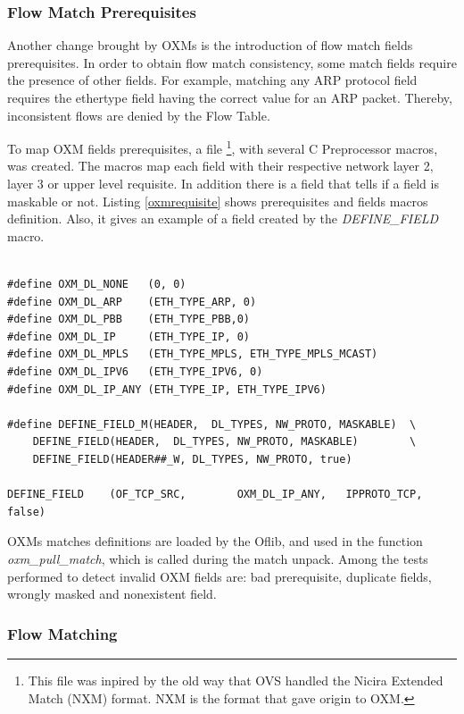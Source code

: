     \subsubsection{Flow Match Prerequisites}
    
    Another change brought by OXMs is the introduction of flow match fields prerequisites. In order to obtain flow match consistency, some match fields require the presence of other fields. For example, matching any ARP protocol field requires the ethertype field having the correct value for an ARP packet. Thereby, inconsistent flows are denied by the Flow Table.  
      
    To map OXM fields prerequisites, a file \footnote{This file was inpired by the old way that OVS handled the Nicira Extended Match (NXM) format. NXM is the format that gave origin to OXM.}, with several C Preprocessor macros, was created. The macros map each field with their respective network layer 2, layer 3 or upper level requisite. In addition there is a field that tells if a field is maskable or not. Listing \ref{oxmrequisite} shows prerequisites and fields macros definition. Also, it gives an example of a field created by the \textit{DEFINE_FIELD} macro. 
\\
\begin{lstlisting}[caption={Ethernet parsing in the nbee_link module}, label=oxmrequisite,]

#define OXM_DL_NONE   (0, 0)
#define OXM_DL_ARP    (ETH_TYPE_ARP, 0)
#define OXM_DL_PBB    (ETH_TYPE_PBB,0)
#define OXM_DL_IP     (ETH_TYPE_IP, 0)
#define OXM_DL_MPLS   (ETH_TYPE_MPLS, ETH_TYPE_MPLS_MCAST)
#define OXM_DL_IPV6   (ETH_TYPE_IPV6, 0)
#define OXM_DL_IP_ANY (ETH_TYPE_IP, ETH_TYPE_IPV6)

#define DEFINE_FIELD_M(HEADER,  DL_TYPES, NW_PROTO, MASKABLE)  \
    DEFINE_FIELD(HEADER,  DL_TYPES, NW_PROTO, MASKABLE)        \
    DEFINE_FIELD(HEADER##_W, DL_TYPES, NW_PROTO, true)

DEFINE_FIELD    (OF_TCP_SRC,        OXM_DL_IP_ANY,   IPPROTO_TCP,    false)

\end{lstlisting}   

    OXMs matches definitions are loaded by the Oflib, and used in the function \textit{oxm_pull_match}, which is called during the match unpack. Among the tests performed to detect invalid OXM fields are: bad prerequisite, duplicate fields, wrongly masked and nonexistent field.  

    \subsubsection{Flow Matching}
    
